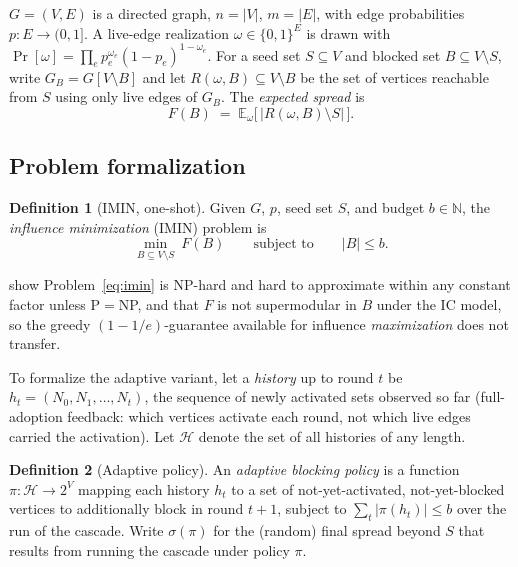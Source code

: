 \documentclass[preprint,11pt]{elsarticle}
\theoremstyle{definition}
\newtheorem{definition}{Definition}
\theoremstyle{remark}
\newcommand{\Rspread}{R}
\newcommand{\FF}{F}
\begin{document}
$G=(V,E)$ is a directed graph,
$n=|V|$, $m=|E|$, with edge probabilities $p:E\to(0,1]$. A live-edge
realization $\omega\in\{0,1\}^E$ is drawn with
$\Pr[\omega]=\prod_{e}p_e^{\omega_e}(1-p_e)^{1-\omega_e}$. For a seed set
$S\subseteq V$ and blocked set $B\subseteq V\setminus S$, write
$G_B=G[V\setminus B]$ and let $\Rspread(\omega,B)\subseteq V\setminus B$ be
the set of vertices reachable from $S$ using only live edges of $G_B$. The
\emph{expected spread} is
\begin{equation}\label{eq:spread}
\FF(B)\;=\;\mathbb E_\omega\bigl[\,|\Rspread(\omega,B)\setminus S|\,\bigr].
\end{equation}

\subsection{Problem formalization}\label{sec:formalization}

\begin{definition}[IMIN, one-shot]\label{def:imin}
Given $G$, $p$, seed set $S$, and budget $b\in\mathbb N$, the
\emph{influence minimization} (IMIN) problem is
\begin{equation}\label{eq:imin}
\min_{B\subseteq V\setminus S}\ \FF(B)
\qquad\text{subject to}\qquad
|B|\le b.
\end{equation}
\end{definition}

\noindent \citet{xie2023} show Problem~\eqref{eq:imin} is NP-hard and hard
to approximate within any constant factor unless P$=$NP, and that $\FF$ is
not supermodular in $B$ under the IC model, so the greedy
$(1-1/e)$-guarantee available for influence \emph{maximization}
\citep{kempe2003} does not transfer.

To formalize the adaptive variant, let a \emph{history} up to round $t$ be
$h_t=(N_0,N_1,\dots,N_t)$, the sequence of newly activated sets observed so
far (full-adoption feedback: which vertices activate each round, not which
live edges carried the activation). Let $\mathcal H$ denote the set of all
histories of any length.

\begin{definition}[Adaptive policy]\label{def:policy}
An \emph{adaptive blocking policy} is a function
$\pi:\mathcal H\to 2^V$ mapping each history $h_t$ to a set of
not-yet-activated, not-yet-blocked vertices to additionally block in round
$t+1$, subject to $\sum_{t}|\pi(h_t)|\le b$ over the run of the cascade.
Write $\sigma(\pi)$ for the (random) final spread beyond $S$ that results
from running the cascade under policy $\pi$.
\end{definition}
\end{document}
